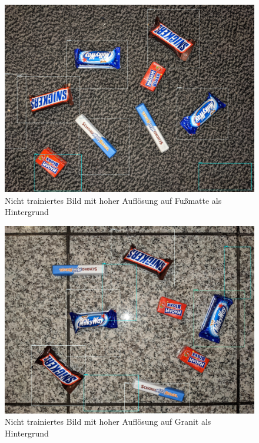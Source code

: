     \begin{figure}[H]
        \centering
        \includegraphics[angle = 90, width = \textwidth]{Bilder/models/model_comparison/ssd_resnet50_v1_fpn_640x640_coco17_tpu-8/HD_on_doormat.jpg}
        \caption{Nicht trainiertes Bild mit hoher Auflösung auf Fußmatte als Hintergrund}
    \end{figure}
    
    \begin{figure}[H]
        \centering
        \includegraphics[angle = 90, width = \textwidth]{Bilder/models/model_comparison/ssd_resnet50_v1_fpn_640x640_coco17_tpu-8/HD_on_granite.jpg}
        \caption{Nicht trainiertes Bild mit hoher Auflösung auf Granit als Hintergrund}
    \end{figure}
    
